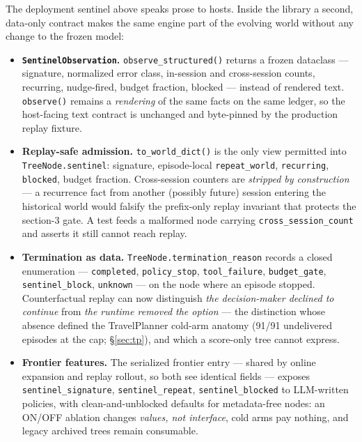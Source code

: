 \documentclass[11pt,a4paper]{article}
\newcommand{\hdr}[1]{\textbf{#1}}
\begin{document}
The deployment sentinel above speaks prose to hosts. Inside the library a
second, data-only contract makes the same engine part of the evolving world
without any change to the frozen model:

\begin{itemize}
  \item \hdr{\texttt{SentinelObservation}.}
  \texttt{observe\_structured()} returns a frozen dataclass --- signature,
  normalized error class, in-session and cross-session counts, recurring,
  nudge-fired, budget fraction, blocked --- instead of rendered text.
  \texttt{observe()} remains a \emph{rendering} of the same facts on the
  same ledger, so the host-facing text contract is unchanged and byte-pinned
  by the production replay fixture.
  \item \hdr{Replay-safe admission.} \texttt{to\_world\_dict()} is the only
  view permitted into \texttt{TreeNode.sentinel}: signature,
  episode-local \texttt{repeat\_world}, \texttt{recurring},
  \texttt{blocked}, budget fraction. Cross-session counters are
  \emph{stripped by construction} --- a recurrence fact from another
  (possibly future) session entering the historical world would falsify the
  prefix-only replay invariant that protects the section-3 gate. A test
  feeds a malformed node carrying \texttt{cross\_session\_count} and asserts
  it still cannot reach replay.
  \item \hdr{Termination as data.} \texttt{TreeNode.termination\_reason}
  records a closed enumeration --- \texttt{completed},
  \texttt{policy\_stop}, \texttt{tool\_failure}, \texttt{budget\_gate},
  \texttt{sentinel\_block}, \texttt{unknown} --- on the node where an
  episode stopped. Counterfactual replay can now distinguish
  \emph{the decision-maker declined to continue} from \emph{the runtime
  removed the option} --- the distinction whose absence defined the
  TravelPlanner cold-arm anatomy (91/91 undelivered episodes at the cap;
  \S\ref{sec:tp}), and which a score-only tree cannot express.
  \item \hdr{Frontier features.} The serialized frontier entry --- shared
  by online expansion and replay rollout, so both see identical fields ---
  exposes \texttt{sentinel\_signature}, \texttt{sentinel\_repeat},
  \texttt{sentinel\_blocked} to LLM-written policies, with
  clean-and-unblocked defaults for metadata-free nodes: an ON/OFF ablation
  changes \emph{values, not interface}, cold arms pay nothing, and legacy
  archived trees remain consumable.
\end{itemize}
\end{document}
